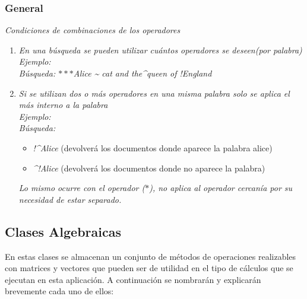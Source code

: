 \documentclass[options]{article}
\begin{document}
\subsubsection{General}
\begin{center}
    \textit{Condiciones de combinaciones de los operadores}
\end{center}
\begin{enumerate}
    \item \textit{En una búsqueda se pueden utilizar cuántos operadores se deseen(por palabra)}\\
    \textit{Ejemplo:}\\
    \textit{Búsqueda: $\ast \ast \ast $Alice \textasciitilde} \textit{cat  and the\textasciicircum queen of !England}
    \item \textit{Si se utilizan dos o más operadores en una misma palabra solo se aplica el más interno a la palabra}\\
    \textit{Ejemplo:}\\
    \textit{Búsqueda:}
    \begin{itemize}
        \item \textit{!\textasciicircum Alice }(devolverá los documentos donde aparece la palabra alice)\\
        \item \textit{\textasciicircum !Alice} (devolverá los documentos donde no aparece la palabra)
    \end{itemize}
    \textit{Lo mismo ocurre con el operador ($\ast $), no aplica al operador cercanía por su necesidad de estar separado.}
\end{enumerate}
\subsection{Clases Algebraicas}
En estas clases se almacenan un conjunto de métodos de operaciones realizables con matrices y vectores que pueden ser de utilidad en el tipo de cálculos que se ejecutan en esta aplicación. A continuación se nombrarán y explicarán brevemente cada uno de ellos:\\
\end{document}
